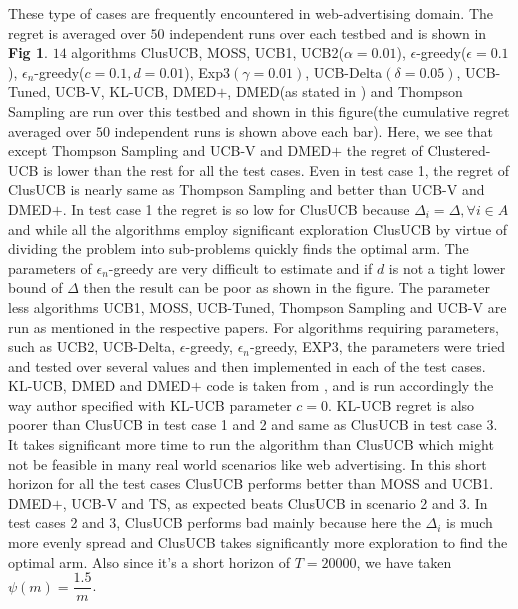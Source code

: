	These type of cases are frequently encountered in web-advertising domain. The regret is averaged over $50$ independent runs over each testbed and is shown in \textbf{Fig 1}. $14$ algorithms ClusUCB, MOSS, UCB1, UCB2($\alpha=0.01$), $\epsilon$-greedy($\epsilon=0.1$), $\epsilon_{n}$-greedy($c=0.1,d=0.01$), Exp3$(\gamma=0.01)$, UCB-Delta$(\delta=0.05)$, UCB-Tuned, UCB-V, KL-UCB, DMED$+$, DMED(as stated in \cite{garivier2011kl}) and Thompson Sampling are run over this testbed and shown in this figure(the cumulative regret averaged over $50$ independent runs is shown above each bar). Here, we see that except Thompson Sampling and UCB-V and DMED$+$ the regret of Clustered-UCB is lower than the rest for all the test cases. Even in test case 1, the regret of ClusUCB is nearly same as Thompson Sampling and better than UCB-V and DMED$+$. In test case 1 the regret is so low for ClusUCB because $\Delta_{i}=\Delta, \forall i\in A$ and while all the algorithms employ significant exploration ClusUCB by virtue of dividing 
the problem into sub-problems quickly finds the optimal arm. The parameters of $\epsilon_{n}$-greedy are very difficult to estimate and if $d$ is not a tight lower bound of $\Delta$ then the result can be poor as shown in the figure. The parameter less algorithms  UCB1, MOSS, UCB-Tuned, Thompson Sampling and UCB-V are run as mentioned in the respective papers. For algorithms requiring parameters, such as UCB2, UCB-Delta, $\epsilon$-greedy, $\epsilon_{n}$-greedy, EXP3, the parameters were tried and tested over several values and then implemented in each of the test cases. KL-UCB, DMED and DMED$+$ code is taken from \cite{CapGarKau12}, and is run accordingly the way author specified with KL-UCB parameter $c=0$.  KL-UCB regret is also poorer than ClusUCB in test case 1 and 2 and same as ClusUCB in test case 3. It takes significant more time to run the algorithm than ClusUCB which might not be feasible in many real world scenarios like web advertising. In this short horizon for all the test cases ClusUCB 
performs better than MOSS and UCB1. DMED$+$, UCB-V and TS, as expected beats ClusUCB in scenario 2 and 3. In test cases 2 and 3, ClusUCB performs bad mainly because here the $\Delta_{i}$ is much more evenly spread and ClusUCB takes significantly more exploration to find the optimal arm. Also since it's a short horizon of $T=20000$, we have taken $\psi(m)=\dfrac{1.5}{m}$.


